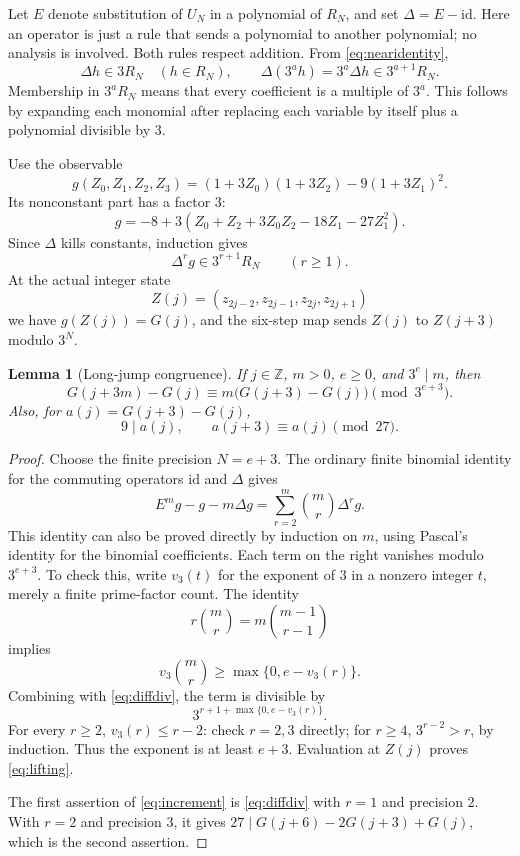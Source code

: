 \documentclass[11pt,a4paper]{article}
\newtheorem{lemma}[theorem]{Lemma}
\theoremstyle{definition}
\newcommand{\Z}{\mathbb Z}
\begin{document}
Let \(E\) denote substitution of \(U_N\) in a polynomial of
\(R_N\), and set \(\Delta=E-\mathrm{id}\). Here an operator is
just a rule that sends a polynomial to another polynomial; no analysis
is involved. Both rules respect addition. From \eqref{eq:nearidentity},
\[
 \Delta h\in3R_N\quad(h\in R_N),\qquad
 \Delta(3^a h)=3^a\Delta h\in3^{a+1}R_N.
\]
Membership in \(3^aR_N\) means that every coefficient is a multiple
of \(3^a\).
This follows by expanding each monomial after replacing each variable
by itself plus a polynomial divisible by \(3\).

Use the observable
\[
 g(Z_0,Z_1,Z_2,Z_3)=(1+3Z_0)(1+3Z_2)-9(1+3Z_1)^2.
\]
Its nonconstant part has a factor \(3\):
\[
 g=-8+3(Z_0+Z_2+3Z_0Z_2-18Z_1-27Z_1^2).
\]
Since \(\Delta\) kills constants, induction gives
\begin{equation}\label{eq:diffdiv}
 \Delta^r g\in3^{r+1}R_N\qquad(r\ge1).
\end{equation}
At the actual integer state
\[
 Z(j)=(z_{2j-2},z_{2j-1},z_{2j},z_{2j+1})
\]
we have \(g(Z(j))=G(j)\), and the six-step map sends
\(Z(j)\) to \(Z(j+3)\) modulo \(3^N\).

\begin{lemma}[Long-jump congruence]\label{lem:lifting}
If \(j\in\Z\), \(m>0\), \(e\ge0\), and \(3^e\mid m\), then
\begin{equation}\label{eq:lifting}
 G(j+3m)-G(j)
 \equiv m\bigl(G(j+3)-G(j)\bigr)\pmod{3^{e+3}}.
\end{equation}
Also, for \(a(j)=G(j+3)-G(j)\),
\begin{equation}\label{eq:increment}
 9\mid a(j),\qquad a(j+3)\equiv a(j)\pmod{27}.
\end{equation}
\end{lemma}
\begin{proof}
Choose the finite precision \(N=e+3\). The ordinary finite binomial
identity for the commuting operators \(\mathrm{id}\) and \(\Delta\)
gives
\[
 E^mg-g-m\Delta g=\sum_{r=2}^{m}\binom mr\Delta^r g.
\]
This identity can also be proved directly by induction on \(m\),
using Pascal's identity for the binomial coefficients.
Each term on the right vanishes modulo \(3^{e+3}\). To check this,
write \(v_3(t)\) for the exponent of \(3\) in a nonzero integer
\(t\), merely a finite prime-factor count. The identity
\[
 r\binom mr=m\binom{m-1}{r-1}
\]
implies
\[
 v_3\binom mr\ge\max\{0,e-v_3(r)\}.
\]
Combining with \eqref{eq:diffdiv}, the term is divisible by
\[
 3^{r+1+\max\{0,e-v_3(r)\}}.
\]
For every \(r\ge2\),
\(v_3(r)\le r-2\): check \(r=2,3\) directly; for \(r\ge4\),
\(3^{r-2}>r\), by induction. Thus the exponent is at least
\(e+3\). Evaluation at \(Z(j)\) proves \eqref{eq:lifting}.

The first assertion of \eqref{eq:increment} is
\eqref{eq:diffdiv} with \(r=1\) and precision \(2\).
With \(r=2\) and precision \(3\), it gives
\(27\mid G(j+6)-2G(j+3)+G(j)\), which is the second assertion.
\end{proof}
\end{document}
